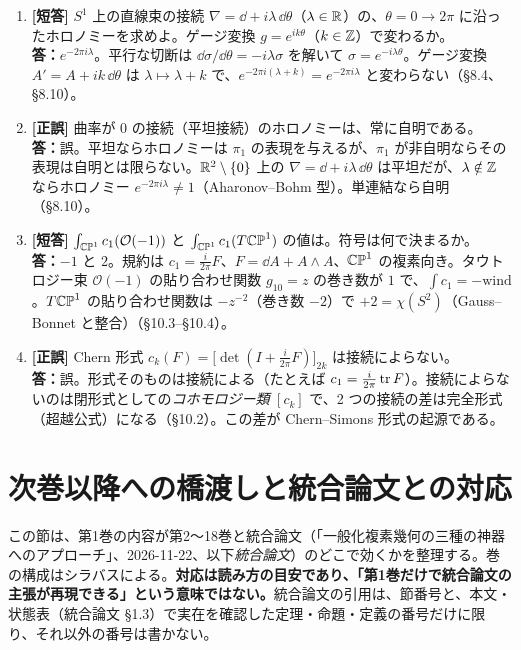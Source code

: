 \begin{enumerate}[label=\textbf{Q\arabic*.},leftmargin=2.6em,itemsep=5pt]
\item \textbf{[短答]} $S^1$ 上の直線束の接続 $\nabla=\dd+i\lambda\,\dd\theta$（$\lambda\in\mathbb R$）の、$\theta=0\to2\pi$ に沿ったホロノミーを求めよ。ゲージ変換 $g=e^{ik\theta}$（$k\in\mathbb Z$）で変わるか。\\
\textbf{答：}$e^{-2\pi i\lambda}$。平行な切断は $\dd\sigma/\dd\theta=-i\lambda\sigma$ を解いて $\sigma=e^{-i\lambda\theta}$。ゲージ変換 $A'=A+ik\,\dd\theta$ は $\lambda\mapsto\lambda+k$ で、$e^{-2\pi i(\lambda+k)}=e^{-2\pi i\lambda}$ と変わらない（§8.4、§8.10）。

\item \textbf{[正誤]} 曲率が $0$ の接続（平坦接続）のホロノミーは、常に自明である。\\
\textbf{答：}誤。平坦ならホロノミーは $\pi_1$ の表現を与えるが、$\pi_1$ が非自明ならその表現は自明とは限らない。$\mathbb R^2\setminus\{0\}$ 上の $\nabla=\dd+i\lambda\,\dd\theta$ は平坦だが、$\lambda\notin\mathbb Z$ ならホロノミー $e^{-2\pi i\lambda}\ne1$（Aharonov--Bohm 型）。単連結なら自明（§8.10）。

\item \textbf{[短答]} $\int_{\mathbb{CP}^1}c_1(\mathcal O(-1))$ と $\int_{\mathbb{CP}^1}c_1(T\mathbb{CP}^1)$ の値は。符号は何で決まるか。\\
\textbf{答：}$-1$ と $2$。規約は $c_1=\frac{i}{2\pi}F$、$F=\dd A+A\wedge A$、$\mathbb{CP}^1$ の複素向き。タウトロジー束 $\mathcal O(-1)$ の貼り合わせ関数 $g_{10}=z$ の巻き数が $1$ で、$\int c_1=-\mathrm{wind}$。$T\mathbb{CP}^1$ の貼り合わせ関数は $-z^{-2}$（巻き数 $-2$）で $+2=\chi(S^2)$（Gauss--Bonnet と整合）（§10.3--§10.4）。

\item \textbf{[正誤]} Chern 形式 $c_k(F)=\bigl[\det(I+\frac{i}{2\pi}F)\bigr]_{2k}$ は接続によらない。\\
\textbf{答：}誤。形式そのものは接続による（たとえば $c_1=\frac{i}{2\pi}\operatorname{tr} F$）。接続によらないのは閉形式としての\emph{コホモロジー類} $[c_k]$ で、2 つの接続の差は完全形式（超越公式）になる（§10.2）。この差が Chern--Simons 形式の起源である。
\end{enumerate}

\clearpage
\section*{次巻以降への橋渡しと統合論文との対応}
この節は、第1巻の内容が第2〜18巻と統合論文（「一般化複素幾何の三種の神器へのアプローチ」、2026-11-22、以下\emph{統合論文}）のどこで効くかを整理する。巻の構成はシラバスによる。\textbf{対応は読み方の目安であり、「第1巻だけで統合論文の主張が再現できる」という意味ではない。}統合論文の引用は、節番号と、本文・状態表（統合論文 §1.3）で実在を確認した定理・命題・定義の番号だけに限り、それ以外の番号は書かない。

